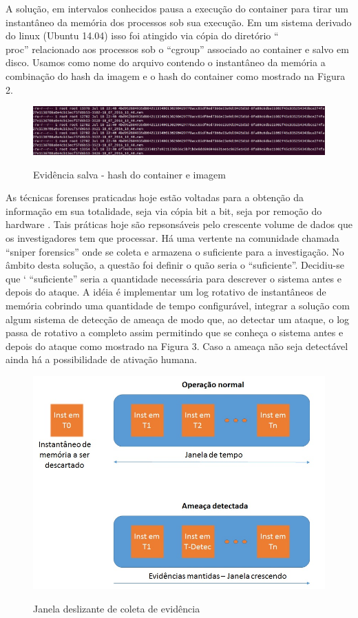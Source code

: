 \documentclass[
	12pt,				%
	openright,			%
	oneside,			%
	a4paper,			%
	english,			%
	french,				%
	spanish,			%
	brazil,				%
	]{abntex2}
\begin{document}
A solução, em intervalos conhecidos pausa a execução
do container para tirar um instantâneo da memória dos processos sob sua execução. Em um sistema derivado do linux (Ubuntu 14.04) isso foi atingido via cópia do diretório
``\\proc'' relacionado aos processos sob o ``cgroup'' associado ao container e salvo em disco. Usamos como nome do arquivo contendo o instantâneo da memória a combinação 
do hash da imagem e o hash do container como mostrado na Figura 2.

\begin{figure}[h!]
\caption{Evidência salva - hash do container e imagem}
\includegraphics[scale=0.3]{snapshot.jpg}
\centering
\label{fig:instantaneo}
\end{figure}

As técnicas forenses praticadas hoje estão voltadas para a obtenção da informação em sua totalidade, seja via cópia bit a bit, seja por remoção do hardware \cite{Simou2014}
\cite{Bem2008}. Tais práticas hoje são repsonsáveis pelo crescente volume de dados que os investigadores tem que processar. Há uma vertente na comunidade chamada ``sniper 
forensics'' onde se coleta e armazena o suficiente para a investigação. No âmbito desta solução, a questão foi definir o quão seria o ``suficiente''. Decidiu-se que `
``suficiente'' seria a quantidade necessária para descrever o sistema antes e depois do ataque. A idéia é implementar um log rotativo de instantâneos de memória cobrindo
uma quantidade de tempo configurável, integrar a solução com algum sistema de detecção de ameaça de modo que, ao detectar um ataque, o log passa de rotativo a completo assim
permitindo que se conheça o sistema antes e depois do ataque como mostrado na Figura 3. Caso a ameaça não seja detectável ainda há a possibilidade de ativação humana.

\begin{figure}[h!]
\caption{Janela deslizante de coleta de evidência}
\includegraphics[scale=0.5]{janela.jpg}
\centering
\label{fig:janela}
\end{figure}
\end{document}
